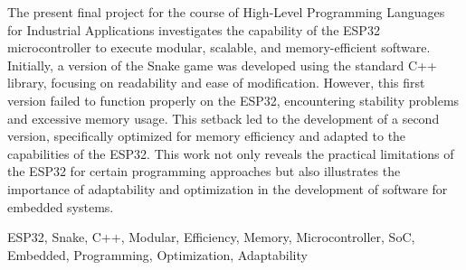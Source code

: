 \newpage 
\vspace*{200px}
\thispagestyle{empty}

\begin{abstract_en}
{\em

The present final project for the course of High-Level Programming Languages for Industrial Applications investigates the capability of the ESP32 microcontroller to execute modular, scalable, and memory-efficient software. Initially, a version of the Snake game was developed using the standard C++ library, focusing on readability and ease of modification. However, this first version failed to function properly on the ESP32, encountering stability problems and excessive memory usage. This setback led to the development of a second version, specifically optimized for memory efficiency and adapted to the capabilities of the ESP32. This work not only reveals the practical limitations of the ESP32 for certain programming approaches but also illustrates the importance of adaptability and optimization in the development of software for embedded systems.
}
\bigskip

\begin{keywords}

ESP32, Snake, C++, Modular, Efficiency, Memory, Microcontroller, SoC, Embedded, Programming, Optimization, Adaptability
\end{keywords}

\end{abstract_en}
